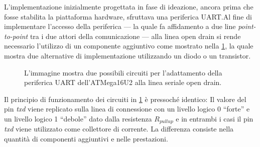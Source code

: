 L'implementazione inizialmente progettata in fase di ideazione, ancora prima che fosse stabilita la piattaforma hardware, sfruttava una periferica UART.\@ Al fine di implementare l'accesso della periferica --- la quale fa affidamento a due line \textit{point-to-point} tra i due attori della comunicazione --- alla linea open drain si rende necessario l'utilizzo di un componente aggiuntivo come mostrato nella \cref{fig:od-impl}, la quale mostra due alternative di implementazione utilizzando un diodo o un transistor. 

\begin{figure}[t]
    \centering

    \caption[]{L'immagine mostra due possibili circuiti per l'adattamento della periferica UART dell'ATMega16U2 alla linea seriale open drain.}\label{fig:od-impl}
\end{figure}

Il principio di funzionamento dei circuiti in \cref{fig:od-impl} è pressoché identico: Il valore del pin \textit{txd} viene replicato sulla linea di connessione con un livello logico 0 ``forte'' e un livello logico 1 ``debole'' dato dalla resistenza \(R_{pullup}\) e in entrambi i casi il pin \textit{txd} viene utilizzato come collettore di corrente.
La differenza consiste nella quantità di componenti aggiuntivi e nelle prestazioni.


